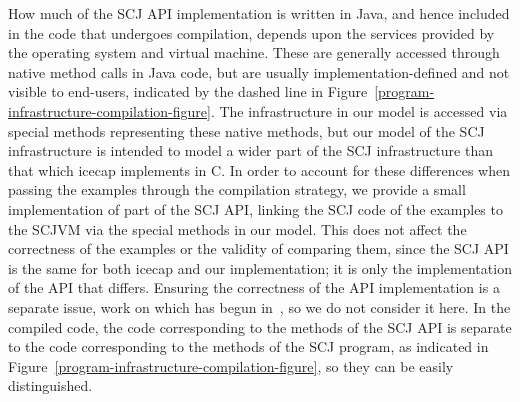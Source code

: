 How much of the SCJ API implementation is written in Java, and hence
included in the code that undergoes compilation, depends upon the
services provided by the operating system and virtual machine.
These are generally accessed through native method calls in Java code,
but are usually implementation-defined and not visible to end-users,
indicated by the dashed line in
Figure~\ref{program-infrastructure-compilation-figure}.
The infrastructure in our model is accessed via special methods
representing these native methods, but our model of the SCJ
infrastructure is intended to model a wider part of the SCJ
infrastructure than that which icecap implements in C.
In order to account for these differences when passing the examples
through the compilation strategy, we provide a small implementation of
part of the SCJ API, linking the SCJ code of the examples to the SCJVM
via the special methods in our model.
This does not affect the correctness of the examples or the validity
of comparing them, since the SCJ API is the same for both icecap and
our implementation; it is only the implementation of the API that
differs.
Ensuring the correctness of the API implementation is a separate
issue, work on which has begun in~\cite{freitas2016}, so we do not
consider it here.
In the compiled code, the code corresponding to the methods of the SCJ
API is separate to the code corresponding to the methods of the SCJ
program, as indicated in
Figure~\ref{program-infrastructure-compilation-figure}, so they can be
easily distinguished.


